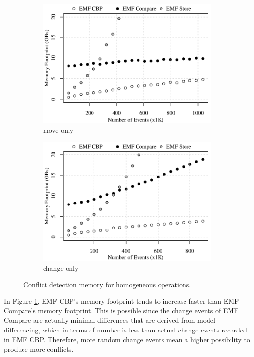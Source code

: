 \begin{figure}[ht]
\begin{subfigure}[t]{0.490\linewidth}
	\includegraphics[width=\linewidth]{move-conflict-memory-events}
	\caption{move-only}
	\label{fig:move-conflict-memory-events}
\end{subfigure}
\hfill
\begin{subfigure}[t]{0.490\linewidth}
	\includegraphics[width=\linewidth]{change-conflict-memory-events}
	\caption{change-only}
	\label{fig:change-conflict-memory-events}
\end{subfigure}
\caption{Conflict detection memory for homogeneous operations.}
\label{fig:homgeneous_operation_memory_events}
\end{figure}

In Figure \ref{fig:move-conflict-memory-events}, EMF CBP's memory footprint tends to increase faster than EMF Compare's memory footprint. This is possible since the change events of EMF Compare are actually minimal differences that are derived from model differencing, which in terms of number is less than actual change events recorded in EMF CBP. Therefore, more random change events mean a higher possibility to produce more conflicts.

